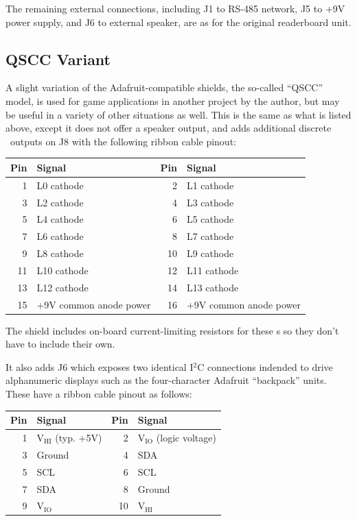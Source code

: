The remaining external connections, including 
J1 to RS-485 network,
J5 to +9V power supply,
and
J6 to external speaker,
are as for the original readerboard unit.

\subsection{QSCC Variant}
A slight variation of the Adafruit-compatible shields, the so-called ``QSCC'' model, is used for game applications in another project by the author,
but may be useful in a variety of other situations as well. This is the same as what is listed above, except it does not offer a speaker output,
and adds additional discrete \led\ outputs on J8 with the following ribbon cable pinout:

\begin{center}
	\begin{tabular}{rl|rl}\toprule
		\bfseries Pin&\bfseries Signal &
		\bfseries Pin&\bfseries Signal \\\midrule
		1&L0 cathode & 2&L1 cathode\\
		3&L2 cathode & 4&L3 cathode\\
		5&L4 cathode & 6&L5 cathode\\
		7&L6 cathode & 8&L7 cathode\\
		9&L8 cathode &10&L9 cathode\\
		11&L10 cathode &12&L11 cathode\\
		13&L12 cathode &14&L13 cathode\\
		15&+9V common anode power&16&+9V common anode power\\\bottomrule
	\end{tabular}
\end{center}
The shield includes on-board current-limiting resistors for these \led s so they don't have to include their own.

It also adds J6 which exposes two identical I$^2$C connections indended to drive alphanumeric displays such as the
four-character Adafruit ``backpack'' units.  These have a ribbon cable pinout as follows:
\begin{center}
	\begin{tabular}{rl|rl}\toprule
		\bfseries Pin&\bfseries Signal &
		\bfseries Pin&\bfseries Signal \\\midrule
		1&V$_{\text{HI}}$ (typ. +5V) & 2&V$_{\text{IO}}$ (logic voltage)\\
		3&Ground                     & 4&SDA\\
		5&SCL                        & 6&SCL\\
		7&SDA                        & 8&Ground\\
		9&V$_{\text{IO}}$            &10&V$_{\text{HI}}$\\\bottomrule
	\end{tabular}
\end{center}

